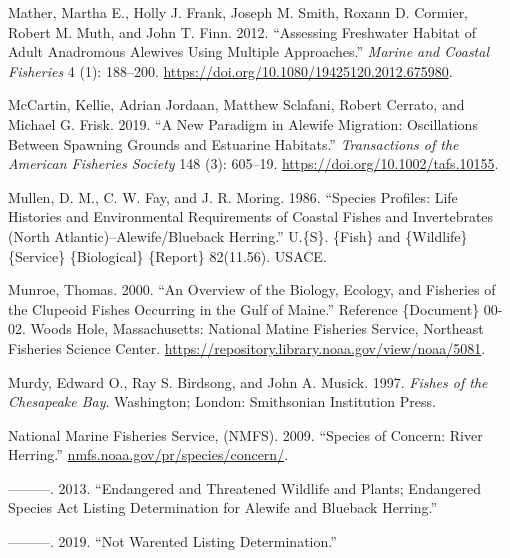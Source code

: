 \documentclass[
]{book}
\newlength{\cslhangindent}
\newlength{\cslentryspacingunit} %
\newenvironment{CSLReferences}[2] %
 {%
  \setlength{\parindent}{0pt}
  \ifodd #1
  \let\oldpar\par
  \def\par{\hangindent=\cslhangindent\oldpar}
  \fi
  \setlength{\parskip}{#2\cslentryspacingunit}
 }%
 {}
\begin{document}
\begin{CSLReferences}{1}{0}
\leavevmode{}%
Mather, Martha E., Holly J. Frank, Joseph M. Smith, Roxann D. Cormier, Robert M. Muth, and John T. Finn. 2012. {``Assessing {Freshwater} {Habitat} of {Adult} {Anadromous} {Alewives} {Using} {Multiple} {Approaches}.''} \emph{Marine and Coastal Fisheries} 4 (1): 188--200. \url{https://doi.org/10.1080/19425120.2012.675980}.

\leavevmode{}%
McCartin, Kellie, Adrian Jordaan, Matthew Sclafani, Robert Cerrato, and Michael G. Frisk. 2019. {``A {New} {Paradigm} in {Alewife} {Migration}: {Oscillations} Between {Spawning} {Grounds} and {Estuarine} {Habitats}.''} \emph{Transactions of the American Fisheries Society} 148 (3): 605--19. \url{https://doi.org/10.1002/tafs.10155}.

\leavevmode{}%
Mullen, D. M., C. W. Fay, and J. R. Moring. 1986. {``Species Profiles: Life Histories and Environmental Requirements of Coastal Fishes and Invertebrates ({North} {Atlantic})--Alewife/Blueback Herring.''} U.\{S\}. \{Fish\} and \{Wildlife\} \{Service\} \{Biological\} \{Report\} 82(11.56). USACE.

\leavevmode{}%
Munroe, Thomas. 2000. {``An Overview of the Biology, Ecology, and Fisheries of the Clupeoid Fishes Occurring in the {Gulf} of {Maine}.''} Reference \{Document\} 00-02. Woods Hole, Massachusetts: National Matine Fisheries Service, Northeast Fisheries Science Center. \url{https://repository.library.noaa.gov/view/noaa/5081}.

\leavevmode{}%
Murdy, Edward O., Ray S. Birdsong, and John A. Musick. 1997. \emph{Fishes of the {Chesapeake} {Bay}}. Washington; London: Smithsonian Institution Press.

\leavevmode{}%
National Marine Fisheries Service, (NMFS). 2009. {``Species of Concern: River Herring.''} \href{https://nmfs.noaa.gov/pr/species/concern/}{nmfs.noaa.gov/pr/species/concern/}.

\leavevmode{}%
---------. 2013. {``Endangered and Threatened Wildlife and Plants; Endangered Species Act Listing Determination for Alewife and Blueback Herring.''}

\leavevmode{}%
---------. 2019. {``Not {Warented} {Listing} {Determination}.''}


\end{CSLReferences}
\end{document}
